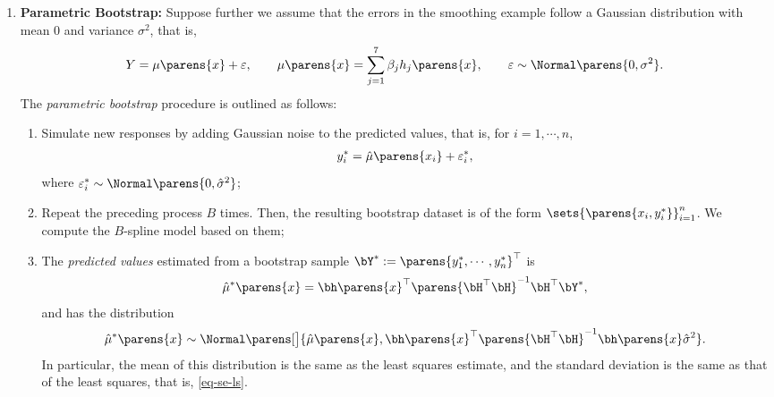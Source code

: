 \documentclass[12pt]{article}
\begin{document}
\begin{enumerate}[label=\textbf{\arabic*.}]
	\item \textbf{Parametric Bootstrap:} Suppose further we assume that the errors in the smoothing example follow a Gaussian distribution with mean 0 and variance $\sigma^2$, that is, 
	\begin{align}\label{eq-smoothing-model}
		Y = \mu \parens{x} + \varepsilon, \qquad \mu \parens{x} = \sum_{j=1}^7 \beta_j h_j \parens{x}, \qquad \varepsilon \sim \Normal \parens{0, \sigma^2}. 
	\end{align}
	The \emph{parametric bootstrap} procedure is outlined as follows: 
	\begin{enumerate}
		\item Simulate new responses by adding Gaussian noise to the predicted values, that is, for $i = 1, \cdots, n$, 
		\begin{align}
			y_i^* = \hat{\mu} \parens{x_i} + \varepsilon_i^*, 
		\end{align}
		where $\varepsilon^*_i \sim \Normal \parens{0, \hat{\sigma}^2}$; 
		
		\item Repeat the preceding process $B$ times. Then, the resulting bootstrap dataset is of the form $\sets{\parens{x_i, y_i^*}}_{i=1}^n$. We compute the $B$-spline model based on them; 
		
		\item The \emph{predicted values} estimated from a bootstrap sample $\bY^* := \parens{y_1^*, \cdots, y_n^*}^\top$ is 
		\begin{align*}
			\hat{\mu}^* \parens{x} = \bh \parens{x}^\top \parens{\bH^\top \bH}^{-1} \bH^\top \bY^*, 
		\end{align*}
		and has the distribution
		\begin{align}\label{bootdis}
			\hat{\mu}^* \parens{x} \sim \Normal \parens[\big]{\hat{\mu} \parens{x}, \bh \parens{x}^\top \parens{\bH^\top \bH}^{-1} \bh \parens{x} \hat{\sigma}^2}. 
		\end{align}
		In particular, the mean of this distribution is the same as the least squares estimate, and the standard deviation is the same as that of the least squares, that is, \eqref{eq-se-ls}. 
		
	\end{enumerate}
	
	

\end{enumerate}
\end{document}
